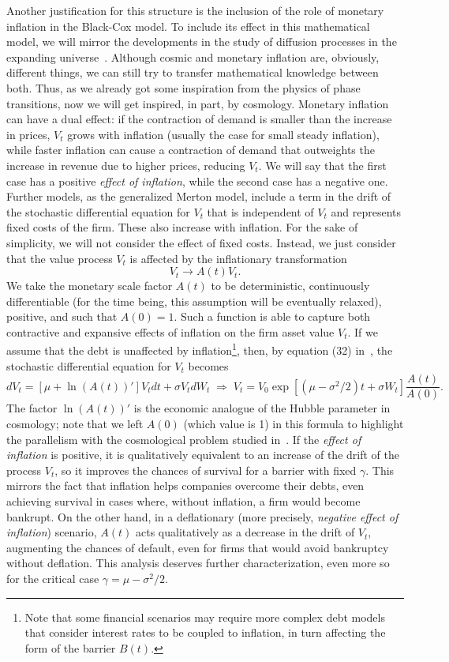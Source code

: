 \documentclass[12pt]{article}
\theoremstyle{definition}
\begin{document}
Another justification for this structure is the inclusion of the role of monetary inflation in the Black-Cox model. To include its effect in this mathematical model, we will mirror the developments in the study of diffusion processes in the expanding universe~\cite{aevy2019,eyav2018,veay2018,yae2016}. Although cosmic and monetary inflation are, obviously, different things, we can still try to transfer mathematical knowledge between both. Thus, as we already got some inspiration from the physics of phase transitions, now we will get inspired, in part, by cosmology. Monetary inflation can have a dual effect: if the contraction of demand is smaller than the increase in prices, $V_t$ grows with inflation (usually the case for small steady inflation), while faster inflation can cause a contraction of demand that outweights the increase in revenue due to higher prices, reducing $V_t$. We will say that the first case has a positive \textit{effect of inflation}, while the second case has a negative one. Further models, as the generalized Merton model, include a term in the drift of the stochastic differential equation for $V_t$ that is independent of $V_t$ and represents fixed costs of the firm. These also increase with inflation. For the sake of simplicity, we will not consider the effect of fixed costs. Instead, we just consider that the value process $V_t$ is affected by the inflationary transformation
$$
V_t \longrightarrow A(t) V_t.
$$
We take the monetary scale factor $A(t)$ to be deterministic, continuously differentiable (for the time being, this assumption will be eventually relaxed), positive, and such that $A(0)=1$. Such a function is able to capture both contractive and expansive effects of inflation on the firm asset value $V_t$. If we assume that the debt is unaffected by inflation\footnote{Note that some financial scenarios may require more complex debt models that consider interest rates to be coupled to inflation, in turn affecting the form of the barrier $B(t)$.}, then, by equation (32) in~\cite{yae2016}, the stochastic differential equation for $V_t$ becomes
$$ \nonumber
dV_t = [\mu + \ln(A(t))'] V_t dt + \sigma V_t dW_t
\;\Rightarrow\;
V_t = V_0 \exp[(\mu - \sigma^2/2)t + \sigma W_t] \frac{A(t)}{A(0)}.
$$
The factor $\ln(A(t))'$ is the economic analogue of the Hubble parameter in cosmology; note that we left $A(0)$ (which value is 1) in this formula to highlight the parallelism with the cosmological problem studied in~\cite{yae2016}. If the \textit{effect of inflation} is positive, it is qualitatively equivalent to an increase of the drift of the process $V_t$, so it improves the chances of survival for a barrier with fixed $\gamma$. This mirrors the fact that inflation helps companies overcome their debts, even  achieving survival in cases where, without inflation, a firm would become bankrupt. On the other hand, in a deflationary (more precisely, \textit{negative effect of inflation}) scenario, $A(t)$ acts qualitatively as a decrease in the drift of $V_t$, augmenting the chances of default, even for firms that would avoid bankruptcy without deflation. This analysis deserves further characterization, even more so for the critical case $\gamma=\mu-\sigma^2/2$.
\end{document}
